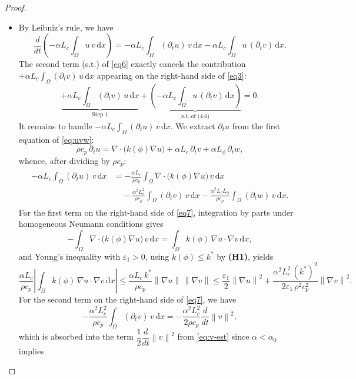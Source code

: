\documentclass[10pt,a4paper]{amsart}
\newcommand{\abs}[1]{\left|#1\right|}
\newcommand{\dx}{\,\mathrm{d}x}
\newcommand{\norm}[1]{\left\|#1\right\|}
\newcommand{\ptn}{\partial_t}
\begin{document}
\begin{proof}
		\begin{itemize}
			\item[\textbf{(i)}]
			By Leibniz's rule, we have
			\begin{equation}
				\label{eq6}
				\frac{d}{dt}\!\left(-\alpha L_c\int_\Omega u\,v\dx\right)
				= -\alpha L_c\int_\Omega (\ptn u)\,v\dx
				-\alpha L_c\int_\Omega u\,(\ptn v)\dx.
			\end{equation}
			The second term (s.t.) of \eqref{eq6} exactly cancels the contribution
			$+\alpha L_c\int_\Omega (\ptn v)\,u\dx$ appearing on the right-hand side
			of \eqref{eq3}:
			\[
			\underbrace{+\alpha L_c\int_\Omega (\ptn v)\,u\dx}_{\text{Step 1}}
			+
			\underbrace{\left( -\alpha L_c\int_\Omega u\,(\ptn v)\dx \right) }_{\text{s.t. of (4.6)}} 
			= 0.
			\]
			It remains to handle $-\alpha L_c\int_\Omega (\ptn u)\,v\dx$.
			We extract $\ptn u$ from the first equation of \eqref{eq:uvw}:
			\[
			\rho c_p\,\ptn u
			= \nabla\cdot\bigl(k(\phi)\nabla u\bigr)
			+ \alpha L_c\,\ptn v
			+ \alpha L_\phi\,\ptn w,
			\]
			whence, after dividing by $\rho c_p$:
			\begin{align}
				\label{eq7}
				\begin{split}
					-\alpha L_c\int_\Omega (\ptn u)\,v\dx
					&= -\frac{\alpha L_c}{\rho c_p}
					\int_\Omega \nabla\cdot\bigl(k(\phi)\nabla u\bigr)\,v\dx \\
					&\quad
					-\frac{\alpha^2 L_c^2}{\rho c_p}
					\int_\Omega (\ptn v)\,v\dx
					-\frac{\alpha^2 L_c L_\phi}{\rho c_p}
					\int_\Omega (\ptn w)\,v\dx.
				\end{split}
			\end{align}
			For the first term on the right-hand side of \eqref{eq7}, integration by parts under homogeneous
			Neumann conditions gives
			\[
			-\int_\Omega \nabla\cdot\bigl(k(\phi)\nabla u\bigr)\,v\dx
			= \int_\Omega k(\phi)\,\nabla u\cdot\nabla v\dx,
			\]
			and Young's inequality with $\varepsilon_1 > 0$, using
			$k(\phi) \leq k^*$ by \textbf{(H1)}, yields
			\[
			\frac{\alpha L_c}{\rho c_p}
			\abs{\int_\Omega k(\phi)\,\nabla u\cdot\nabla v\dx}
			\leq
			\frac{\alpha L_c\, k^*}{\rho c_p}\norm{\nabla u}\,\norm{\nabla v}
			\leq
			\frac{\varepsilon_1}{2}\norm{\nabla u}^2
			+ \frac{\alpha^2 L_c^2\,(k^*)^2}{2\varepsilon_1\,\rho^2 c_p^2}\norm{\nabla v}^2.
			\]
			For the second term on the right-hand side of \eqref{eq7}, we have
			\[
			-\frac{\alpha^2 L_c^2}{\rho c_p}
			\int_\Omega (\ptn v)\,v\dx
			= -\frac{\alpha^2 L_c^2}{2\rho c_p}\frac{d}{dt}\norm{v}^2,
			\]
			which is absorbed into the term $\dfrac{1}{2}\dfrac{d}{dt}\norm{v}^2$ from \eqref{eq:v-est} since $\alpha < \alpha_0$ implies

\end{itemize}
\end{proof}
\end{document}

